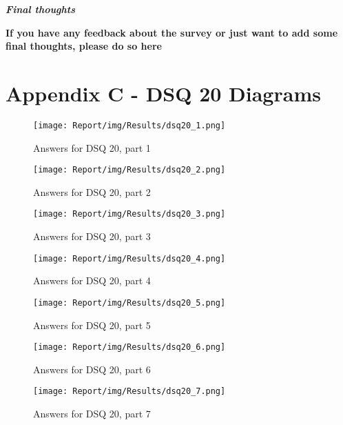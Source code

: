 \documentclass[a4paper,12pt]{article}
\begin{document}
\quad

\quad 

\textbf{\textit{Final thoughts}}

\textbf{If you have any feedback about the survey or just want to add some final thoughts, please do so here}

\newpage
\section{Appendix C - DSQ 20 Diagrams}

\begin{figure}[ht!]
    \centering
    \texttt{[image: Report/img/Results/dsq20\_1.png]}
    \caption{Answers for DSQ 20, part 1}
    \label{fig:res_devq20_1}
\end{figure}

\begin{figure}[ht!]
    \centering
    \texttt{[image: Report/img/Results/dsq20\_2.png]}
    \caption{Answers for DSQ 20, part 2}
    \label{fig:res_devq20_2}
\end{figure}

\begin{figure}[ht!]
    \centering
    \texttt{[image: Report/img/Results/dsq20\_3.png]}
    \caption{Answers for DSQ 20, part 3}
    \label{fig:res_devq20_3}
\end{figure}
\newpage

\begin{figure}[ht!]
    \centering
    \texttt{[image: Report/img/Results/dsq20\_4.png]}
    \caption{Answers for DSQ 20, part 4}
    \label{fig:res_devq20_4}
\end{figure}

\begin{figure}[ht!]
    \centering
    \texttt{[image: Report/img/Results/dsq20\_5.png]}
    \caption{Answers for DSQ 20, part 5}
    \label{fig:res_devq20_5}
\end{figure}

\begin{figure}[ht!]
    \centering
    \texttt{[image: Report/img/Results/dsq20\_6.png]}
    \caption{Answers for DSQ 20, part 6}
    \label{fig:res_devq20_6}
\end{figure}
\newpage

\begin{figure}[ht!]
    \centering
    \texttt{[image: Report/img/Results/dsq20\_7.png]}
    \caption{Answers for DSQ 20, part 7}
    \label{fig:res_devq20_7}
\end{figure}
\end{document}
